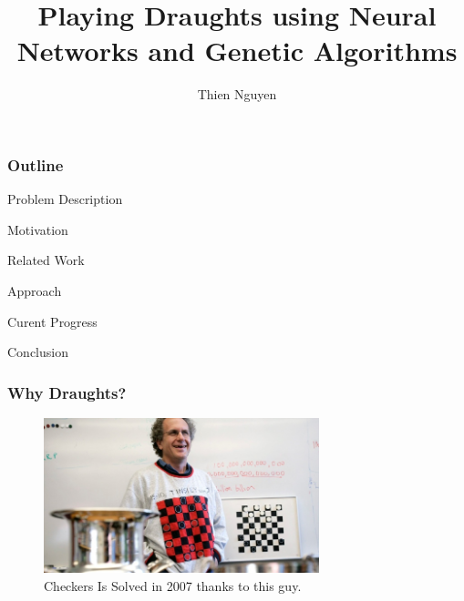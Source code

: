 \documentclass[aspectratio=169]{beamer}
\title[NN and GA To Play Draughts] %
	{Playing Draughts using Neural Networks and Genetic Algorithms}
\author[T. Nguyen] %
	{Thien Nguyen}
\institute[Durham] %
	{
	Department of Computer Science\\
	Durham University
	}
\begin{document}
\pgfplotsset{compat=1.15}

\frame{\titlepage}

\begin{frame}

  \frametitle{Outline}
	\begin{block}{Problem Description}
	 \end{block}
	\begin{block}{Motivation}
	\end{block}
	\begin{block}{Related Work}
	\end{block}
	\begin{block}{Approach}
	\end{block}
	\begin{block}{Curent Progress}
	\end{block}
	\begin{block}{Conclusion}
	\end{block}
	  
  
\end{frame}

\begin{frame}
	\frametitle{Why Draughts?}
	\begin{figure}[ht!]
		\centering
		\includegraphics[width=80mm]{schaeffer.jpg}
		\caption{Checkers Is Solved in 2007 thanks to this guy. \cite{schaeffer_solving_1996}}
	\end{figure}
\end{frame}
\end{document}
